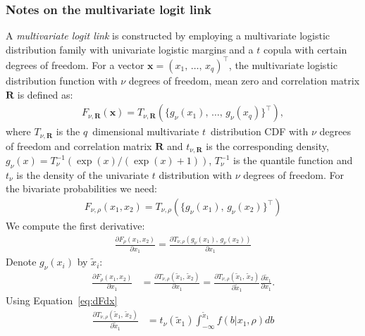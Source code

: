 \documentclass[a4paper,fleqn]{article}
\begin{document}
\subsubsection{Notes on the multivariate logit link}
A \emph{multivariate
  logit link} is constructed by employing a multivariate logistic
distribution family with univariate logistic margins and a $t$ copula
with certain degrees of freedom.  For a vector $\bm x=(x_1,\,\dots,\,
x_q)^\top$, the multivariate logistic distribution function with $\nu$
degrees of freedom, mean zero and correlation matrix $\bm R$ is defined as:
\begin{align}\label{eqn:logistic}
  F_{\nu, \bm R}(\bm x) = T_{\nu, \bm
    R}(\{g_\nu(x_1),\, \dots,\,
  g_\nu(x_q)\}^\top),
\end{align}
where $T_{\nu,\bm R}$ is the $q$~dimensional multivariate
$t$~distribution CDF with $\nu$ degrees of freedom and correlation matrix
$\bm R$ and $t_{\nu,\bm R}$ is the corresponding density, $g_\nu(x) =
T^{-1}_{\nu}(\exp(x)/(\exp(x) + 1))$, $T^{-1}_{\nu}$ is the quantile
function and $t_{\nu}$ is the density of the univariate $t$ distribution with $\nu$ degrees of
freedom.
For the bivariate probabilities we need:
\begin{align*}
  F_{\nu,\rho}(x_1, x_2) = T_{\nu, \rho}(\{g_\nu(x_1),\,
  g_\nu(x_2)\}^\top)
\end{align*}
We compute the first derivative:
\begin{align*}
  \frac{\partial F_{\rho}(x_1, x_2)}{\partial x_1}= \frac{\partial T_{\nu, \rho}(g_\nu(x_1),\,
    g_\nu(x_2))}{\partial x_1}
\end{align*}
Denote $g_\nu(x_i)$ by $\tilde x_i$:
\begin{align*}
  \frac{\partial F_{\rho}(x_1, x_2)}{\partial x_1} &= \frac{\partial T_{\nu, \rho}(\tilde x_1,\,\tilde x_2)}{\partial x_1} =
  \frac{\partial T_{\nu, \rho}(\tilde x_1,\,\tilde x_2)}{\partial \tilde x_1} \frac{\partial \tilde x_1}{\partial x_1}.
\end{align*}
Using Equation~\eqref{eq:dFdx}
\begin{align*}
   \frac{\partial T_{\nu, \rho}(\tilde x_1,\,\tilde x_2)}{\partial \tilde x_1}  & = t_\nu(\tilde x_1)  \int_{-\infty}^{\tilde x_1} f(b|x_1, \rho)db
\end{align*}
\end{document}
